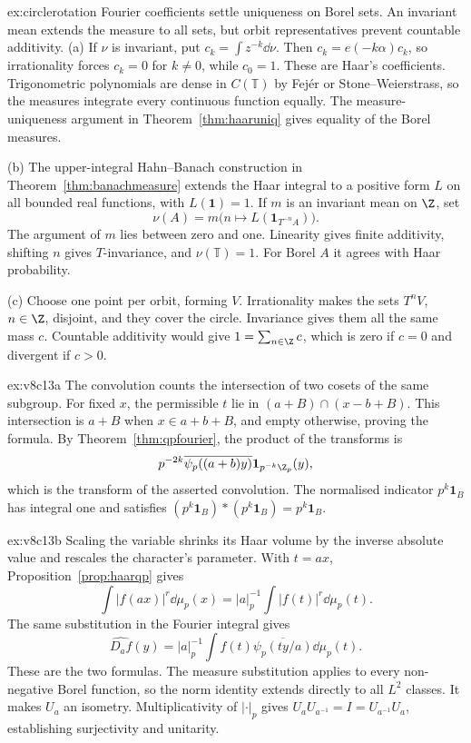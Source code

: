 \begin{solution}{ex:circlerotation}
\idea Fourier coefficients settle uniqueness on Borel sets. An invariant mean extends the measure to all sets, but orbit representatives prevent countable additivity.
\writeup (a) If $\nu$ is invariant, put $c_k=\int z^{-k}\dd\nu$. Then $c_k=e(-k\alpha)c_k$, so irrationality forces $c_k=0$ for $k\ne0$, while $c_0=1$. These are Haar's coefficients. Trigonometric polynomials are dense in $C(\mathbb T)$ by Fej\'er or Stone--Weierstrass, so the measures integrate every continuous function equally. The measure-uniqueness argument in Theorem~\ref{thm:haaruniq} gives equality of the Borel measures.

(b) The upper-integral Hahn--Banach construction in Theorem~\ref{thm:banachmeasure} extends the Haar integral to a positive form $L$ on all bounded real functions, with $L(\mathbf1)=1$. If $m$ is an invariant mean on $\Z$, set
\[\nu(A)=m\bigl(n\mapsto L(\mathbf1_{T^{-n}A})\bigr).
\]
The argument of $m$ lies between zero and one. Linearity gives finite additivity, shifting $n$ gives $T$-invariance, and $\nu(\mathbb T)=1$. For Borel $A$ it agrees with Haar probability.

(c) Choose one point per orbit, forming $V$. Irrationality makes the sets $T^nV$, $n\in\Z$, disjoint, and they cover the circle. Invariance gives them all the same mass $c$. Countable additivity would give $1=\sum_{n\in\Z}c$, which is zero if $c=0$ and divergent if $c>0$.
\end{solution}
\begin{solution}{ex:v8c13a}
\idea The convolution counts the intersection of two cosets of the same subgroup.
\writeup For fixed $x$, the permissible $t$ lie in $(a+B)\cap(x-b+B)$. This intersection is $a+B$ when $x\in a+b+B$, and empty otherwise, proving the formula. By Theorem~\ref{thm:qpfourier}, the product of the transforms is
\[p^{-2k}\overline{\psi_p((a+b)y)}\mathbf1_{p^{-k}\Z_p}(y),\]
which is the transform of the asserted convolution. The normalised indicator $p^k\mathbf1_B$ has integral one and satisfies $(p^k\mathbf1_B)*(p^k\mathbf1_B)=p^k\mathbf1_B$.
\end{solution}
\begin{solution}{ex:v8c13b}
\idea Scaling the variable shrinks its Haar volume by the inverse absolute value and rescales the character's parameter.
\writeup With $t=ax$, Proposition~\ref{prop:haarqp} gives
\[\int|f(ax)|^r\dd\mu_p(x)=|a|_p^{-1}\int|f(t)|^r\dd\mu_p(t).
\]
The same substitution in the Fourier integral gives
\[\widehat{D_af}(y)=|a|_p^{-1}\int f(t)\overline{\psi_p(ty/a)}\dd\mu_p(t).
\]
These are the two formulas. The measure substitution applies to every non-negative Borel function, so the norm identity extends directly to all $L^2$ classes. It makes $U_a$ an isometry. Multiplicativity of $|\cdot|_p$ gives $U_aU_{a^{-1}}=I=U_{a^{-1}}U_a$, establishing surjectivity and unitarity.
\end{solution}
